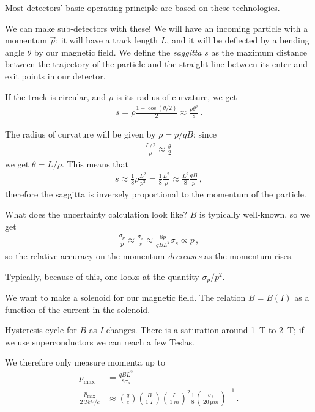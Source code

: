 \documentclass[main.tex]{subfiles}
\begin{document}
Most detectors' basic operating principle are based on these technologies.

We can make sub-detectors with these! 
We will have an incoming particle with a momentum \(\vec{p}\); 
it will have a track length \(L\), and it will be deflected by a bending
angle \(\theta \) by our magnetic field. 
We define the \emph{saggitta} \(s\) as the maximum distance between the trajectory of the particle and the straight line between its enter and exit points in our detector. 

If the track is circular, and \(\rho \) is its radius of curvature, we get 
%
\begin{align}
s = \rho \frac{1 - \cos(\theta /2)}{2} \approx \frac{\rho \theta^2}{8}
\,.
\end{align}

The radius of curvature will be given by \(\rho = p / qB\); 
since 
%
\begin{align}
\frac{L/2}{\rho } \approx \frac{\theta }{2}
\,
\end{align}
%
we get \(\theta = L/ \rho \). 
This means that 
%
\begin{align}
s \approx \frac{1}{8} \rho \frac{L^2}{p^2} = \frac{1}{8} \frac{L^2}{\rho } \approx \frac{L^2}{8} \frac{qB}{p}
\,,
\end{align}
%
therefore the saggitta is inversely proportional to the momentum of the 
particle. 

What does the uncertainty calculation look like? \(B\) is typically well-known, so we get 
%
\begin{align}
\frac{\sigma_p}{p} \approx \frac{\sigma _s}{s} \approx \frac{8 p}{qBL^2} \sigma _s \propto p
\,,
\end{align}
%
so the relative accuracy on the momentum \emph{decreases} as the momentum rises. 

Typically, because of this, one looks at the quantity \(\sigma _p / p^2\). 

We want to make a solenoid for our magnetic field. 
The relation \(B = B(I)\) as a function of the current in the solenoid. 

Hysteresis cycle for \(B\) as \(I\) changes. 
There is a saturation around \SI{1}{T} to \SI{2}{T}; if we use superconductors we can reach a few Teslas. 

We therefore only measure momenta up to 
%
\begin{align}
p _{\text{max}} &= \frac{q B L^2}{8 \sigma _s}  
 \\
\frac{p _{\text{max}}}{\SI{2}{TeV} / c} &\approx \left( \frac{q}{e} \right)
\left( \frac{B}{\SI{1}{T}}\right) 
\left( \frac{L}{\SI{1}{m}}\right)^2
\frac{1}{8} \left( \frac{\sigma_s}{\SI{20}{\micro m}}\right)^{-1} 
\,.
\end{align}
\end{document}
